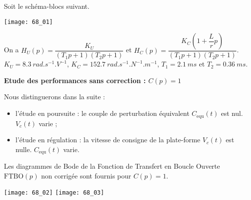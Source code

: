 \normaltrue \difficilefalse \tdifficilefalse
\correctionfalse

\setcounter{question}{0}%


\ifcorrection
\else
{}
\fi

\ifprof
\else

Soit le schéma-blocs suivant. 

\begin{marginfigure}
\texttt{[image: 68\_01]}
\end{marginfigure}

On a $H_U(p) = \dfrac{K_U}{\left( T_1 p +1 \right)\left( T_2 p +1 \right)}$ et $H_C(p) = \dfrac{K_C \left( 1+\dfrac{L}{r}p\right)}{\left( T_1 p +1 \right)\left( T_2 p +1 \right)}$. $K_U =\SI{8,3}{rad.s^{-1}.V^{-1}}$, $K_C = \SI{152,7}{rad.s^{-1}.N^{-1}.m^{-1}}$, $T_1 = \SI{2,1}{ms}$ et $T_2 = \SI{0,36}{ms}$.

\textbf{Etude des performances sans correction : $C( p) =1$}

Nous distinguerons dans la suite :
\begin{itemize}
\item l’étude en poursuite : le couple de perturbation équivalent $C_{\text{equ}} (t)$ est nul. $V_c(t)$ varie ;
\item l’étude en régulation : la vitesse de consigne de la plate-forme $V_c(t)$  est nulle. $C_{\text{equ}} (t)$ varie.
\end{itemize}

Les diagrammes de Bode de la Fonction de Transfert en Boucle Ouverte $\text{FTBO}( p)$ non corrigée sont fournis pour $C( p) = 1$.

\begin{marginfigure}
\texttt{[image: 68\_02]}
\texttt{[image: 68\_03]}
\end{marginfigure}
\fi

\ifprof
\else 
\fi

\ifprof
\else 
\fi

